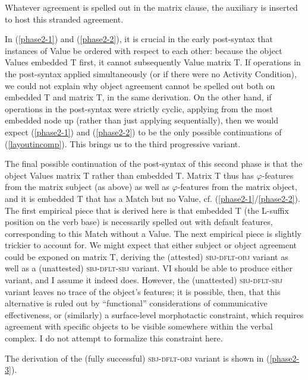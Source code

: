 \documentclass[output=paper
,modfonts
,nonflat]{langsci/langscibook}
\begin{document}
\noindent Whatever agreement is spelled out in the matrix clause, the auxiliary is inserted to host this stranded agreement. 

In (\ref{phase2-1}) and (\ref{phase2-2}), it is crucial in the early post-syntax that instances of Value be ordered with respect to each other: because the object Values embedded T first, it cannot subsequently Value matrix T. If operations in the post-syntax applied simultaneously (or if there were no Activity Condition), we could not explain why object agreement cannot be spelled out both on embedded T and matrix T, in the same derivation. On the other hand, if operations in the post-syntax were strictly cyclic, applying from the most embedded node up (rather than just applying sequentially), then we would expect (\ref{phase2-1}) and (\ref{phase2-2}) to be the only possible continuations of (\ref{layoutincomp}). This brings us to the third progressive variant.

The final possible continuation of the post-syntax of this second phase is that the object Values matrix T rather than embedded T. Matrix T thus has $\varphi$-features from the matrix subject (as above) as well as $\varphi$-features from the matrix object, and it is embedded T that has a Match but no Value, cf. (\ref{phase2-1}/\ref{phase2-2}). The first empirical piece that is derived here is that embedded T (the L-suffix position on the verb base) is necessarily spelled out with default features, corresponding to this Match without a Value. The next empirical piece is slightly trickier to account for. We might expect that either subject or object agreement could be exponed on matrix T, deriving the (attested) \textsc{sbj-dflt-obj} variant as well as a (unattested) \textsc{sbj-dflt-sbj} variant. VI should be able to produce either variant, and I assume it indeed does. However, the (unattested) \textsc{sbj-dflt-sbj} variant leaves no trace of the object's features; it is possible, then, that this alternative is ruled out by ``functional'' considerations of communicative effectiveness, or (similarly) a surface-level morphotactic constraint, which requires agreement with specific objects to be visible somewhere within the verbal complex. I do not attempt to formalize this constraint here.

The derivation of the (fully successful) \textsc{sbj-dflt-obj} variant is shown in (\ref{phase2-3}).\largerpage[2]
\end{document}
